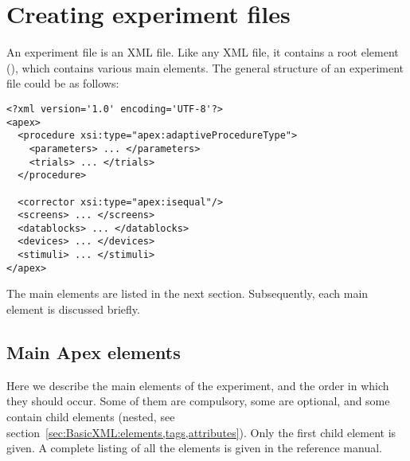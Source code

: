 \chapter{Creating experiment files}
\label{chap:Creating experiment files}

An \apex experiment file is an XML file. Like any XML file, it
contains a root element (), which contains various
main elements. The general structure of an \apex experiment file
could be as follows:

\begin{lstlisting}
<?xml version='1.0' encoding='UTF-8'?>
<apex>
  <procedure xsi:type="apex:adaptiveProcedureType">
    <parameters> ... </parameters>
    <trials> ... </trials>
  </procedure>

  <corrector xsi:type="apex:isequal"/>
  <screens> ... </screens>
  <datablocks> ... </datablocks>
  <devices> ... </devices>
  <stimuli> ... </stimuli>
</apex>
\end{lstlisting}

The main elements are listed in the next section. Subsequently,
each main element is discussed briefly.

\section{Main Apex elements}

Here we describe the main elements of the experiment, and the
order in which they should occur. Some of them are compulsory,
some are optional, and some contain child elements (nested, see
section~\ref{sec:BasicXML:elements,tags,attributes}). Only the
first child element is given. A complete listing of all the
elements is given in the reference manual.


